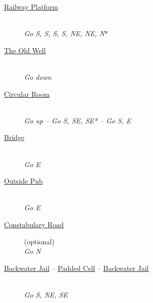 \documentclass[a5paper]{extarticle}
\begin{document}
\newpage{}\label{sec:route-2}
\begin{description}
\item[{\hyperref[sec:req-Railway-Platform]{Railway Platform}}] ~\\
  \emph{Go S, S, S, S, NE, NE, N}*
\item[{\hyperref[sec:req-The-Old-Well]{The Old Well}}] ~\\
  \emph{Go down}
\item[{\hyperref[sec:req-Circular-Room]{Circular Room}}] ~\\
  \emph{Go up -- Go S, SE, SE* -- Go S, E}
\item[{\hyperref[sec:req-Bridge]{Bridge}}] ~\\
  \emph{Go E}
\item[{\hyperref[sec:req-Outside-Pub]{Outside Pub}}] ~\\
  \emph{Go E}
\item[{\hyperref[sec:req-Constabulary-Road]{Constabulary Road}}] (optional)\\
  \emph{Go N}
\item [{\hyperref[sec:req-Backwater-Jail]{Backwater Jail} --
        \hyperref[sec:req-Padded-Cell]{Padded Cell} --
        \hyperref[sec:req-Backwater-Jail]{Backwater Jail}}] ~\\
  \emph{Go S, NE, SE}
\end{description}
\end{document}
